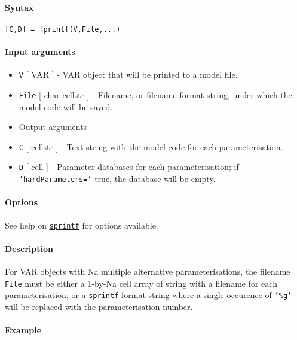 


	\paragraph{Syntax}\label{syntax}

\begin{verbatim}
[C,D] = fprintf(V,File,...)
\end{verbatim}

\paragraph{Input arguments}\label{input-arguments}

\begin{itemize}
\item
  \texttt{V} {[} VAR {]} - VAR object that will be printed to a model
  file.
\item
  \texttt{File} {[} char \textbar{} cellstr {]} - Filename, or filename
  format string, under which the model code will be saved.
\item
  Output arguments
\item
  \texttt{C} {[} cellstr {]} - Text string with the model code for each
  parameterisation.
\item
  \texttt{D} {[} cell {]} - Parameter databases for each
  parameterisation; if \texttt{'hardParameters='} true, the database
  will be empty.
\end{itemize}

\paragraph{Options}\label{options}

See help on \href{VAR/sprintf}{\texttt{sprintf}} for options available.

\paragraph{Description}\label{description}

For VAR objects with Na multiple alternative parameterisations, the
filename \texttt{File} must be either a 1-by-Na cell array of string
with a filename for each parameterisation, or a \texttt{sprintf} format
string where a single occurence of \texttt{'\%g'} will be replaced with
the parameterisation number.

\paragraph{Example}\label{example}


